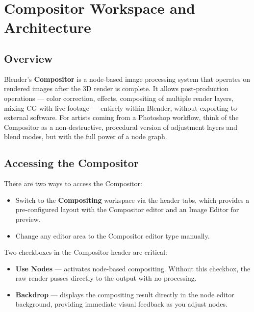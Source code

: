 \section{Compositor Workspace and Architecture}
\label{sec:comp-architecture}

\subsection{Overview}

Blender's \textbf{Compositor} is a node-based image processing system that operates on rendered images after the 3D render is complete. It allows post-production operations --- color correction, effects, compositing of multiple render layers, mixing CG with live footage --- entirely within Blender, without exporting to external software. For artists coming from a Photoshop workflow, think of the Compositor as a non-destructive, procedural version of adjustment layers and blend modes, but with the full power of a node graph.

\subsection{Accessing the Compositor}

There are two ways to access the Compositor:

\begin{itemize}[leftmargin=2em]
  \item Switch to the \textbf{Compositing} workspace via the header tabs, which provides a pre-configured layout with the Compositor editor and an Image Editor for preview.
  \item Change any editor area to the Compositor editor type manually.
\end{itemize}

Two checkboxes in the Compositor header are critical:

\begin{itemize}[leftmargin=2em]
  \item \textbf{Use Nodes} --- activates node-based compositing. Without this checkbox, the raw render passes directly to the output with no processing.
  \item \textbf{Backdrop} --- displays the compositing result directly in the node editor background, providing immediate visual feedback as you adjust nodes.
\end{itemize}

